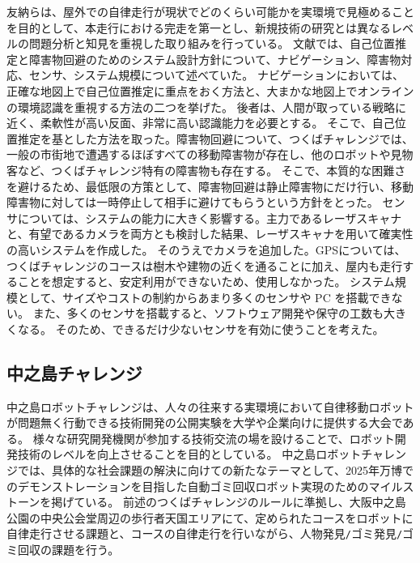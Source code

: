友納ら\cite{auto:tomonoh}は、屋外での自律走行が現状でどのくらい可能かを実環境で見極めることを目的として、本走行における完走を第一とし、新規技術の研究とは異なるレベルの問題分析と知見を重視した取り組みを行っている。
文献では、自己位置推定と障害物回避のためのシステム設計方針について、ナビゲーション、障害物対応、センサ、システム規模について述べていた。
ナビゲーションにおいては、正確な地図上で自己位置推定に重点をおく方法と、大まかな地図上でオンラインの環境認識を重視する方法の二つを挙げた。
後者は、人間が取っている戦略に近く、柔軟性が高い反面、非常に高い認識能力を必要とする。
そこで、自己位置推定を基とした方法を取った。障害物回避について、つくばチャレンジでは、一般の市街地で遭遇するほぼすべての移動障害物が存在し、他のロボットや見物客など、つくばチャレンジ特有の障害物も存在する。
そこで、本質的な困難さを避けるため、最低限の方策として、障害物回避は静止障害物にだけ行い、移動障害物に対しては一時停止して相手に避けてもらうという方針をとった。
センサについては、システムの能力に大きく影響する。主力であるレーザスキャナと、有望であるカメラを両方とも検討した結果、レーザスキャナを用いて確実性の高いシステムを作成した。
そのうえでカメラを追加した。GPSについては、つくばチャレンジのコースは樹木や建物の近くを通ることに加え、屋内も走行することを想定すると、安定利用ができないため、使用しなかった。
システム規模として、サイズやコストの制約からあまり多くのセンサや PC を搭載できない。
また、多くのセンサを搭載すると、ソフトウェア開発や保守の工数も大きくなる。
そのため、できるだけ少ないセンサを有効に使うことを考えた。

\subsection{中之島チャレンジ}
中之島ロボットチャレンジ\cite{auto:nakanoshima}は、人々の往来する実環境において自律移動ロボットが問題無く行動できる技術開発の公開実験を大学や企業向けに提供する大会である。
様々な研究開発機関が参加する技術交流の場を設けることで、ロボット開発技術のレベルを向上させることを目的としている。
中之島ロボットチャレンジでは、具体的な社会課題の解決に向けての新たなテーマとして、2025年万博でのデモンストレーションを目指した自動ゴミ回収ロボット実現のためのマイルストーンを掲げている。
前述のつくばチャレンジのルールに準拠し、大阪中之島公園の中央公会堂周辺の歩行者天国エリアにて、定められたコースをロボットに自律走行させる課題と、コースの自律走行を行いながら、人物発見\verb|/|ゴミ発見\verb|/|ゴミ回収の課題を行う。

